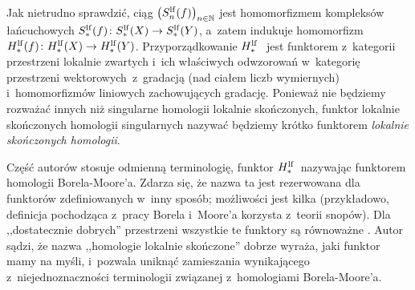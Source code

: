 Jak nietrudno sprawdzić, ciąg $\left(S^{\mathrm{lf}}_n(f)\right)_{n\in\mathbb{N}}$ jest homomorfizmem kompleksów łańcuchowych $S_*^{\mathrm{lf}}(f)\colon S_*^{\mathrm{lf}}(X)\to S_*^{\mathrm{lf}}(Y)$, a~zatem indukuje homomorfizm $H^{\mathrm{lf}}_*(f)\colon H_*^{\mathrm{lf}}(X)\to H_*^{\mathrm{lf}}(Y)$. Przyporządkowanie $H_*^{\mathrm{lf}}~$ jest funktorem z~kategorii przestrzeni lokalnie zwartych i~ich właściwych odwzorowań w~kategorię przestrzeni wektorowych~z~gradacją (nad ciałem liczb wymiernych) i~homomorfizmów liniowych zachowujących gradację. Ponieważ nie będziemy rozważać innych niż singularne homologii lokalnie skończonych, funktor lokalnie skończonych homologii singularnych nazywać będziemy krótko funktorem \textit{lokalnie skończonych homologii}.

Część autorów stosuje odmienną terminologię, funktor $H_*^{\mathrm{lf}}$~nazywając funktorem homologii Borela-Moore'a. Zdarza się, że nazwa ta jest rezerwowana dla funktorów zdefiniowanych w~inny sposób; możliwości jest kilka (przykładowo, definicja pochodząca z~pracy Borela i~Moore'a \cite{Borel60} korzysta z~teorii snopów). Dla ,,dostatecznie dobrych'' przestrzeni wszystkie te funktory są równoważne \cite[Section 2.6]{Chriss10}. Autor sądzi, że nazwa ,,homologie lokalnie skończone'' dobrze wyraża, jaki funktor mamy na myśli, i~pozwala uniknąć zamieszania wynikającego z~niejednoznaczności terminologii związanej z~homologiami Borela-Moore'a.

